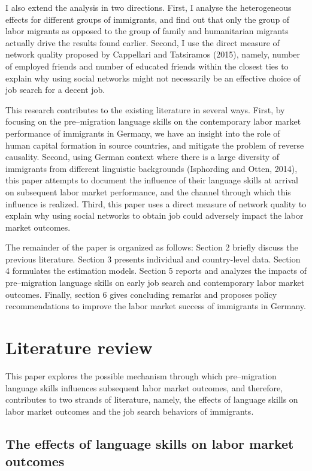 \documentclass[12pt,a4paper]{article}
\begin{document}
I also extend the analysis in two directions. First, I analyse the heterogeneous effects for different groups of immigrants, and find out that only the group of labor migrants as opposed to the group of family and humanitarian migrants actually drive the results found earlier. Second, I use the direct measure of network quality proposed by Cappellari and Tatsiramos (2015), namely, number of employed friends and number of educated friends within the closest ties to explain why using social networks might not necessarily be an effective choice of job search for a decent job.

This research contributes to the existing literature in several ways. First, by focusing on the pre--migration language skills on the contemporary labor market performance of immigrants in Germany, we have an insight into the role of human capital formation in source countries, and mitigate the problem of reverse causality. Second, using German context where there is a large diversity of immigrants from different linguistic backgrounds (Isphording and Otten, 2014), this paper attempts to document the influence of their language skills at arrival on subsequent labor market performance, and the channel through which this influence is realized. Third, this paper uses a direct measure of network quality to explain why using social networks to obtain job could adversely impact the labor market outcomes.

The remainder of the paper is organized as follows: Section 2 briefly discuss the previous literature. Section 3 presents individual and country-level data. Section 4 formulates the estimation models. Section 5 reports and analyzes the impacts of pre--migration language skills on early job search and contemporary labor market outcomes. Finally, section 6 gives concluding remarks and proposes policy recommendations to improve the labor market success of immigrants in Germany.

\section{Literature review}

This paper explores the possible mechanism through which pre--migration language skills influences subsequent labor market outcomes, and therefore, contributes to two strands of literature, namely, the effects of language skills on labor market outcomes and the job search behaviors of immigrants.

\subsection{The effects of language skills on labor market outcomes}
\end{document}
